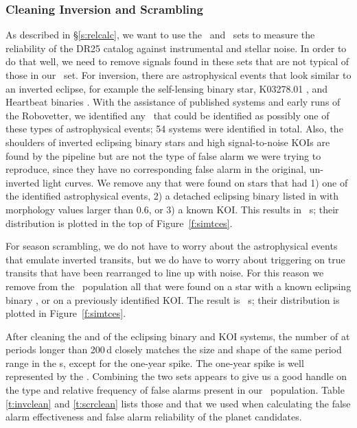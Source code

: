 \subsubsection{Cleaning Inversion and Scrambling}
\label{s:clean}
As described in \S\ref{s:relcalc}, we want to use the \invtce\ and \scrtce\ sets to measure the reliability of the DR25 catalog against instrumental and stellar noise. In order to do that well, we need to remove signals found in these sets that are not typical of those in our \opstce\ set. For inversion, there are astrophysical events that look similar to an inverted eclipse, for example the self-lensing binary star, K03278.01 \citep{Kruse2014}, and Heartbeat binaries \citep{Thompson2012}. With the assistance of published systems and early runs of the Robovetter, we identified any \invtce\ that could be identified as possibly one of these types of astrophysical events; 54 systems were identified in total. Also, the shoulders of inverted eclipsing binary stars and high signal-to-noise KOIs are found by the pipeline but are not the type of false alarm we were trying to reproduce, since they have no corresponding false alarm in the original, un-inverted light curves. We remove any  that were found on stars that had 1) one of the identified astrophysical events, 2) a detached eclipsing binary listed in \citet{Kirk2016} with morphology values larger than 0.6, or 3) a known KOI.  This results in \ninvtces\ \invtce s; their distribution is plotted in the top of Figure~\ref{f:simtces}.

For season scrambling, we do not have to worry about the astrophysical events that emulate inverted transits, but we do have to worry about triggering on true transits that have been rearranged to line up with noise. For this reason we remove from the \scrtce\ population all that were found on a star with a known eclipsing binary \citep{Kirk2016}, or on a previously identified KOI. The result is \nscrtces\ \scrtce s; their distribution is plotted in Figure~\ref{f:simtces}. 

After cleaning the  and  of the eclipsing binary and KOI systems, the number of  at periods longer than 200\,d closely matches the size and shape of the same period range in the \opstce s, except for the one-year spike. The one-year spike is well represented by the .  Combining the two sets appears to give us a good handle on the type and relative frequency of false alarms present in our \opstce\ population. Table\,\ref{t:invclean} and \ref{t:scrclean} lists those  and  that we used when calculating the false alarm effectiveness and false alarm reliability of the planet candidates.




